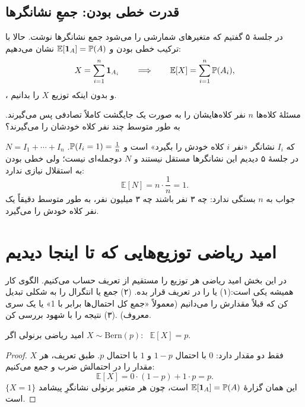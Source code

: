 \subsection{قدرت خطی بودن: جمعِ نشانگرها}

در جلسهٔ ۵ گفتیم که متغیرهای شمارشی را می‌شود جمع نشانگرها نوشت. حالا با ترکیب خطی بودن و $\mathbb E[\ind_A]=\P(A)$ نشان می‌دهیم:
\[ X=\sum_{i=1}^n\ind_{A_i}\qquad\Longrightarrow\qquad \mathbb E[X]=\sum_{i=1}^n\P(A_i), \]
، و بدون اینکه توزیع $X$ را بدانیم.

\begin{example}[label=ex:hats-mean]{مسئلهٔ کلاه‌ها}
  $n$ نفر کلاه‌هایشان را به صورت یک جایگشت کاملاً تصادفی پس می‌گیرند. به طور متوسط چند نفر کلاه خودشان را می‌گیرند؟
  \begin{solution}
    $N=I_1+\cdots+I_n$ که $I_i$ نشانگر «نفر $i$ کلاه خودش را بگیرد» است و $\P(I_i=1)=\frac1n$. در جلسهٔ ۵ دیدیم این نشانگرها مستقل نیستند و $N$ دوجمله‌ای نیست؛ ولی خطی بودن به استقلال نیازی ندارد:
    \[ \mathbb E[N]=n\cdot\frac1n=1. \]
    جواب به $n$ بستگی ندارد: چه ۳ نفر باشند چه ۳ میلیون نفر، به طور متوسط دقیقاً یک نفر کلاه خودش را می‌گیرد.
  \end{solution}
\end{example}

\section{امید ریاضی توزیع‌هایی که تا اینجا دیدیم}
\label{sec:expect-dists}

در این بخش امید ریاضی هر توزیع را مستقیم از تعریف حساب می‌کنیم. الگوی کار همیشه یکی است:\newline (۱)  یا  را در تعریف قرار بده. \newline (۲) جمع یا انتگرال را به شکلی تبدیل کن که قبلاً مقدارش را می‌دانیم (معمولاً «جمع کل احتمال‌ها برابر با 1» یا یک سری معروف) .\newline (۳) نتیجه را با شهود بررسی کن.

\begin{proposition}[label=prop:E-bern]{امید ریاضی برنولی}
  اگر $X\sim\mathrm{Bern}(p)$: \ $\mathbb E[X]=p$.
\end{proposition}
\begin{proof}
  $X$ فقط دو مقدار دارد: $0$ با احتمال $1-p$ و $1$ با احتمال $p$. طبق تعریف، هر مقدار را در احتمالش ضرب و جمع می‌کنیم:
  \[ \mathbb E[X]=0\cdot(1-p)+1\cdot p=p. \]
  این همان گزارهٔ $\mathbb E[\ind_A]=\P(A)$ است، چون هر متغیر برنولی نشانگرِ پیشامد $\{X=1\}$ است.
\end{proof}


